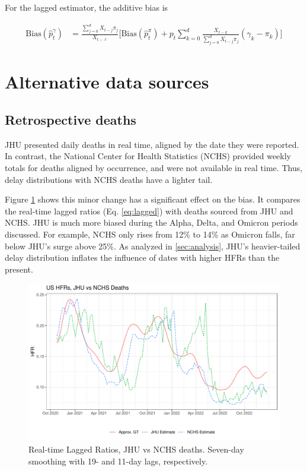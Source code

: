 \documentclass{article}
\begin{document}
For the lagged estimator, the additive bias is

\begin{align*}
         \text{Bias}(\hat{p}_t^\gamma) &=  \frac{\sum_{j=0}^d X_{t-j}\pi_j}{X_{t-\ell}}\Big[\text{Bias}(\hat{p}_t^\pi) + p_t\sum_{k=0}^d \frac{X_{t-k}}{\sum_{j=0}^d X_{t-j}\pi_j}(\gamma_k -\pi_k)\Big]
\end{align*}


\section{Alternative data sources}
\subsection{Retrospective deaths}\label{apx:NCHS_deaths}

JHU presented daily deaths in real time, aligned by the date they were reported. In contrast, the National Center for Health Statistics (NCHS) provided weekly totals for deaths aligned by occurrence, and were not available in real time. Thus, delay distributions with NCHS deaths have a lighter tail. 

Figure \ref{fig:jhu_vs_nchs} shows this minor change has a significant effect on the bias. It compares the real-time lagged ratios (Eq. \eqref{eq:lagged}) with deaths sourced from JHU and NCHS. JHU is much more biased during the Alpha, Delta, and Omicron periods discussed. For example, NCHS only rises from 12\% to 14\% as Omicron falls, far below JHU's surge above 25\%. As analyzed in \ref{sec:analysis}, JHU's heavier-tailed delay distribution inflates the influence of dates with higher HFRs than the present.


\begin{figure}
    \centering
    \includegraphics[width=0.7\linewidth]{Figs/Real/jhu_vs_nchs.pdf}
    \caption{Real-time Lagged Ratios, JHU vs NCHS deaths. Seven-day smoothing with 19- and 11-day lags, respectively.}
    \label{fig:jhu_vs_nchs}
\end{figure}
\end{document}
